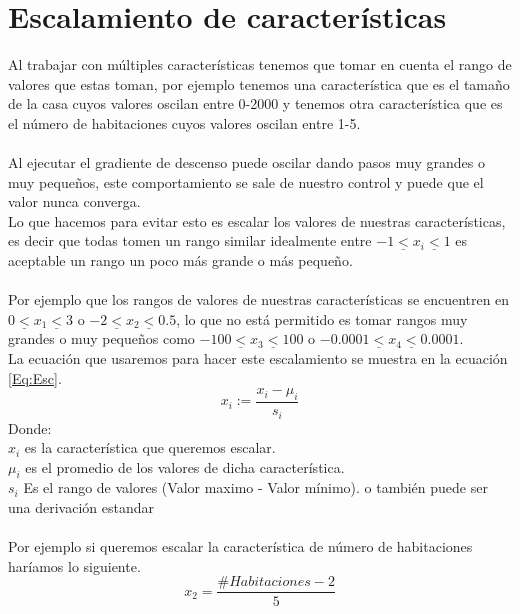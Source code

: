 \documentclass{report}
\begin{document}
\section{Escalamiento de características}
Al trabajar con múltiples características tenemos que tomar en cuenta el rango de valores que estas toman, por ejemplo tenemos una característica que es el tamaño de la casa cuyos valores oscilan entre 0-2000 y tenemos otra característica que es el número de habitaciones cuyos valores oscilan entre 1-5.\\\\Al ejecutar el gradiente de descenso puede oscilar dando pasos muy grandes o muy pequeños, este comportamiento se sale de nuestro control y puede que el valor nunca converga.\\Lo que hacemos para evitar esto es escalar los valores de nuestras características, es decir que todas tomen un rango similar idealmente entre $-1\underline{<} x_i \underline{<}1$ es aceptable un rango un poco más grande o más pequeño. \\\\Por ejemplo que los rangos de valores de nuestras características se encuentren en $0\underline{<}x_1\underline{<}3$ o $-2\underline{<}x_2\underline{<}0.5$, lo que no está permitido es tomar rangos muy grandes o muy pequeños como $-100\underline{<}x_3\underline{<}100$ o $-0.0001\underline{<}x_4\underline{<}0.0001$.\\La ecuación que usaremos para hacer este escalamiento se muestra en la ecuación \ref{Eq:Esc}.
\begin{equation}
	x_i:=\frac{x_i-\mu_i}{s_i}
	\label{Eq:Esc}
\end{equation}
Donde:\\$x_i$ es la característica que queremos escalar.\\$\mu_i$ es el promedio de los valores de dicha característica.\\
$s_i$ Es el rango de valores (Valor maximo - Valor mínimo). o también puede ser una derivación estandar\\\\Por ejemplo si queremos escalar la característica de número de habitaciones haríamos lo siguiente.
\[
x_2=\frac{\#Habitaciones-2}{5}
\]
\end{document}
